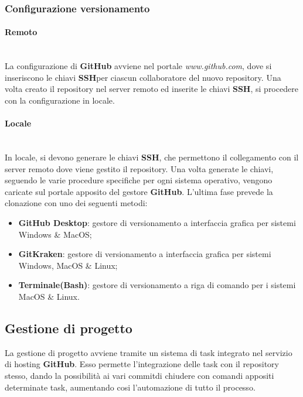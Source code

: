 \subsubsection{Configurazione versionamento}

\paragraph{Remoto} \-\\
	La configurazione di \textbf{GitHub} avviene nel portale \textit{www.github.com}, dove si inseriscono le chiavi \textbf{SSH}\glossario per ciascun collaboratore del nuovo repository. 
	Una volta creato il repository nel server remoto ed inserite le chiavi \textbf{SSH}, si procedere con la configurazione in locale.
	
\paragraph{Locale} \-\\
	In locale, si devono generare le chiavi \textbf{SSH}, che permettono il collegamento con il server remoto dove viene gestito il repository. 
	Una volta generate le chiavi, seguendo le varie procedure specifiche per ogni sistema operativo, vengono caricate sul portale apposito del gestore \textbf{GitHub}.
	L'ultima fase prevede la clonazione con uno dei seguenti metodi: 

	\begin{itemize}
		\item \textbf{GitHub Desktop}: gestore di versionamento a interfaccia grafica per sistemi Windows \& MacOS; 
		\item \textbf{GitKraken}: gestore di versionamento a interfaccia grafica per sistemi Windows, MacOS \& Linux; 		
		\item \textbf{Terminale(Bash)}: gestore di versionamento a riga di comando per i sistemi MacOS \& Linux.
	\end{itemize}
		
\subsection{Gestione di progetto}\label{ProcessiSupporto_GestioneProgetto}
La gestione di progetto avviene tramite un sistema di task integrato nel servizio di hosting \textbf{GitHub}. 
Esso permette l'integrazione delle task con il repository stesso, dando la possibilità ai vari commit\glossario di chiudere con comandi appositi determinate task, aumentando cosi l'automazione di tutto il processo. 

